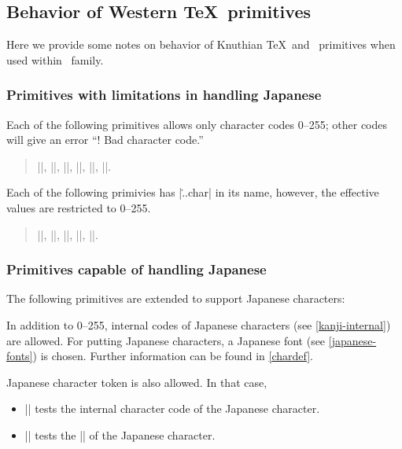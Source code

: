 \documentclass[a4paper,11pt,dvipdfmx]{article}
\begin{document}


\subsection{Behavior of Western \TeX\ primitives}

Here we provide some notes on behavior of Knuthian \TeX\ and \eTeX\ primitives
when used within \pTeX\ family.

\subsubsection{Primitives with limitations in handling Japanese}

Each of the following primitives allows only character codes 0--255;
other codes will give an error ``! Bad character code.''
\begin{quote}
 |\catcode|,
 |\sfcode|,
 |\mathcode|,
 |\delcode|,
 |\lccode|,
 |\uccode|.
\end{quote}

Each of the following primivies has |\...char| in its name,
however, the effective values are restricted to 0--255.
\begin{quote}
 |\endlinechar|,
 |\newlinechar|,
 |\escapechar|,
 ||,
 ||.
\end{quote}

\subsubsection{Primitives capable of handling Japanese}

The following primitives are extended to support Japanese characters:
\begin{cslist}
 \csitem[\.{char} <character code>,
   \.{chardef} <control sequence>=<character code>]
  In addition to 0--255, internal codes of Japanese characters
  (see \ref{kanji-internal}) are allowed.
  For putting Japanese characters, a Japanese font
  (see \ref{japanese-fonts}) is chosen.
  Further information can be found in \ref{chardef}.


 \csitem[\.{accent} <character code>=<character>]

  Japanese character token is also allowed.
  In that case,
  \begin{itemize}
    \item |\if| tests the internal character code of the Japanese character.
    \item |\ifcat| tests the |\kcatcode| of the Japanese character.
  \end{itemize}
\end{cslist}
\end{document}
